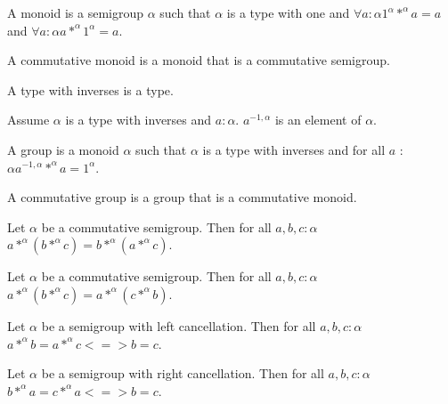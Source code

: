 \documentclass{article}
\begin{document}
\begin{forthel}
\begin{definition} A monoid is a semigroup $\alpha$ such that $\alpha$ is a type
with one and
$\forall a : \alpha 1^{\alpha} *^{\alpha} a = a$ and
$\forall a : \alpha a *^{\alpha} 1^{\alpha} = a$.
\end{definition}

\begin{definition} A commutative monoid is a monoid that
is a commutative semigroup.
\end{definition}

\begin{signature} A type with inverses is a type.
\end{signature}
\begin{signature} Assume $\alpha$ is a type with inverses and $a : \alpha$.
$a^{-1,\alpha}$ is an element of $\alpha$.
\end{signature}

\begin{definition} A group is a monoid $\alpha$ such that $\alpha$ is a type 
with inverses and 
for all $a$ : $\alpha a^{-1,\alpha} *^{\alpha} a = 1^{\alpha}$.
\end{definition}

\begin{definition} A commutative group is a group that is a commutative
monoid.
\end{definition}

\begin{lemma} Let $\alpha$ be a commutative semigroup.
Then for all $a,b,c : \alpha$ 
$a *^{\alpha} (b *^{\alpha} c) = b *^{\alpha} (a *^{\alpha} c)$.
\end{lemma}

\begin{lemma} Let $\alpha$ be a commutative semigroup.
Then for all $a,b,c : \alpha$ 
$a *^{\alpha} (b *^{\alpha} c) = a *^{\alpha} (c *^{\alpha} b)$.
\end{lemma}

\begin{lemma} Let $\alpha$ be a 
semigroup with left cancellation. Then for all $a,b,c : \alpha$ 
$a *^{\alpha} b = a *^{\alpha} c <=> b = c$.
\end{lemma}

\begin{lemma} Let $\alpha$ be a 
semigroup with right cancellation. Then for all $a,b,c : \alpha$ 
$b *^{\alpha} a = c *^{\alpha} a <=> b = c$.
\end{lemma}


\end{forthel}
\end{document}
